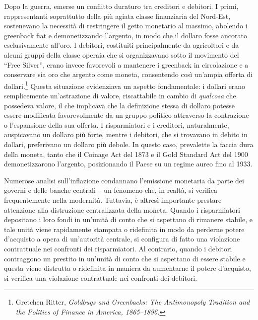 \documentclass[
  a5paper,
  smalldemyvopaper,10pt,twoside,onecolumn,openright,extrafontsizes,hidelinks]{memoir}
\begin{document}
Dopo la guerra, emerse un conflitto duraturo tra creditori e debitori. I
primi, rappresentanti soprattutto della più agiata classe finanziaria
del Nord‐Est, sostenevano la necessità di restringere il getto monetario
al massimo, abolendo i greenback fiat e demonetizzando l'argento, in
modo che il dollaro fosse ancorato esclusivamente all'oro. I debitori,
costituiti principalmente da agricoltori e da alcuni gruppi della classe
operaia che si organizzavano sotto il movimento del ``Free Silver'',
erano invece favorevoli a mantenere i greenback in circolazione e a
conservare sia oro che argento come moneta, consentendo così un'ampia
offerta di dollari.\footnote{Gretchen Ritter, \emph{Goldbugs and
  Greenbacks: The Antimonopoly Tradition and the Politics of Finance in
  America, 1865--1896.}} Questa situazione evidenziava un aspetto
fondamentale: i dollari erano semplicemente un'astrazione di valore,
riscattabile in cambio di \emph{qualcosa} che possedeva valore, il che
implicava che la definizione stessa di dollaro potesse essere modificata
favorevolmente da un gruppo politico attraverso la contrazione o
l'espansione della sua offerta. I risparmiatori e i creditori,
naturalmente, auspicavano un dollaro più forte, mentre i debitori, che
si trovavano in debito in dollari, preferivano un dollaro più debole. In
questo caso, prevalette la faccia dura della moneta, tanto che il
Coinage Act del 1873 e il Gold Standard Act del 1900 demonetizzarono
l'argento, posizionando il Paese su un regime aureo fino al 1933.

Numerose analisi sull'inflazione condannano l'emissione monetaria da
parte dei governi e delle banche centrali -- un fenomeno che, in realtà,
si verifica frequentemente nella modernità. Tuttavia, è altresì
importante prestare attenzione alla distruzione centralizzata della
moneta. Quando i risparmiatori depositano i loro fondi in un'unità di
conto che si aspettano di rimanere stabile, e tale unità viene
rapidamente stampata o ridefinita in modo da perderne potere d'acquisto
a opera di un'autorità centrale, si configura di fatto una violazione
contrattuale nei confronti dei risparmiatori. Al contrario, quando i
debitori contraggono un prestito in un'unità di conto che si aspettano
di essere stabile e questa viene distrutta o ridefinita in maniera da
aumentarne il potere d'acquisto, si verifica una violazione contrattuale
nei confronti dei debitori.
\end{document}
